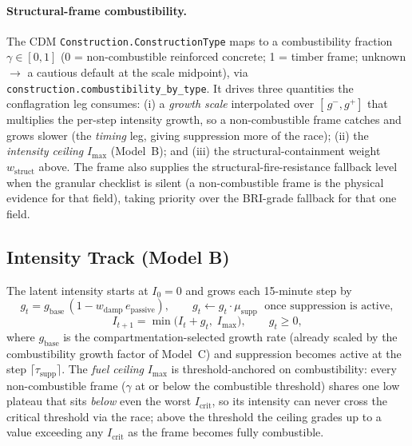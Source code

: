 \documentclass[11pt,a4paper]{article}
\begin{document}
\paragraph{Structural-frame combustibility.} The CDM
\texttt{Construction.ConstructionType} maps to a combustibility fraction
$\gamma\in[0,1]$ (0 = non-combustible reinforced concrete; 1 = timber frame;
unknown $\to$ a cautious default at the scale midpoint), via
\texttt{construction.combustibility\_by\_type}. It drives three quantities the
conflagration leg consumes: (i) a \emph{growth scale} interpolated over
$[\,g^{-},g^{+}]$ that multiplies the per-step intensity growth, so a
non-combustible frame catches and grows slower (the \emph{timing} leg, giving
suppression more of the race); (ii) the \emph{intensity ceiling} $I_{\max}$
(Model~B); and (iii) the structural-containment weight $w_{\text{struct}}$ above.
The frame also supplies the structural-fire-resistance fallback level when the
granular checklist is silent (a non-combustible frame is the physical evidence
for that field), taking priority over the BRI-grade fallback for that one field.

\subsection{Intensity Track (Model B)}

The latent intensity starts at $I_0=0$ and grows each 15-minute step by
\[
g_t = g_{\text{base}}\,(1 - w_{\text{damp}}\, e_{\text{passive}}), \qquad
g_t \leftarrow g_t \cdot \mu_{\text{supp}} \;\text{ once suppression is active},
\]
\[
I_{t+1} = \min\!\big(I_t + g_t,\; I_{\max}\big), \qquad g_t \ge 0,
\]
where $g_{\text{base}}$ is the compartmentation-selected growth rate (already
scaled by the combustibility growth factor of Model~C) and suppression becomes
active at the step $\lceil \tau_{\text{supp}} \rceil$. The \emph{fuel ceiling}
$I_{\max}$ is threshold-anchored on combustibility: every non-combustible frame
($\gamma$ at or below the combustible threshold) shares one low plateau that sits
\emph{below} even the worst $I_{\text{crit}}$, so its intensity can never cross
the critical threshold via the race; above the threshold the ceiling grades up to
a value exceeding any $I_{\text{crit}}$ as the frame becomes fully combustible.
\end{document}
